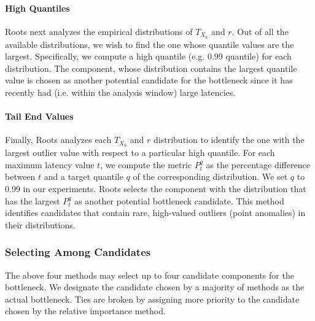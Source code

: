 \paragraph*{High Quantiles}
Roots next analyzes the empirical distributions of $T_{X_k}$ and $r$.
Out of all the available distributions,
we wish to find the one whose quantile values are the largest.
Specifically, we compute a high	
quantile (e.g. 0.99 quantile) for each distribution. The component, whose distribution
contains the largest quantile value
is chosen as another potential candidate for the bottleneck since it has
recently had (i.e. within the analysis window) large latencies. 


\paragraph*{Tail End Values}
Finally, Roots analyzes each $T_{X_k}$ and $r$ distribution to identify the one 
with the largest outlier value with respect to a particular high quantile.
For each maximum latency value $t$, we compute the metric $P^q_t$ 
as the percentage difference between $t$ and a target quantile
$q$ of the corresponding distribution. We set $q$ to 0.99 in our experiments.
Roots selects the component with the 
distribution that has the largest $P^q_t$ as another potential bottleneck candidate.
This method identifies
candidates that contain rare, high-valued outliers (point anomalies) in their distributions.

\subsubsection{Selecting Among Candidates}
The above four methods may select up to four candidate components for the bottleneck. 
We designate 
the candidate chosen by a majority of methods as the actual bottleneck. Ties
are broken by assigning more priority to the candidate chosen by the relative importance
method.
